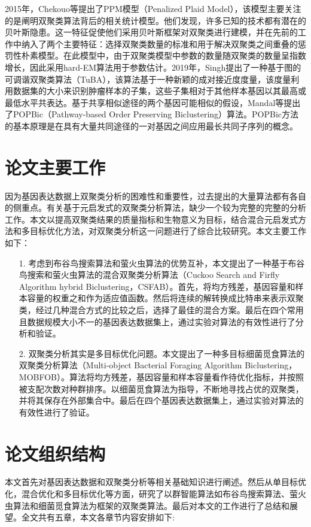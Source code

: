     2015年，Chekouo等提出了PPM模型（Penalized Plaid Model），该模型主要关注的是阐明双聚类算法背后的相关统计模型。他们发现，许多已知的技术都有潜在的贝叶斯隐患。这一特征促使他们采用贝叶斯框架对双聚类进行建模，并在先前的工作中纳入了两个主要特征：选择双聚类数量的标准和用于解决双聚类之间重叠的惩罚性朴素模型。在此模型中，由于双聚类模型中参数的数量随双聚类的数量呈指数增长，因此采用hard-EM算法用于参数估计。2019年，Singh提出了一种基于图的可调谐双聚类算法（TuBA），该算法基于一种新颖的成对接近度度量，该度量利用数据集的大小来识别肿瘤样本的子集，这些子集相对于其他样本基因以其最高或最低水平共表达。基于共享相似途径的两个基因可能相似的假设，Mandal等提出了POPBic（Pathway-based Order Preserving Biclustering）算法。POPBic方法的基本原理是在具有大量共同途径的一对基因之间应用最长共同子序列的概念。

\section{论文主要工作}
    因为基因表达数据上双聚类分析的困难性和重要性，过去提出的大量算法都有各自的侧重点。有关基于元启发式的双聚类分析算法，缺少一个较为完整的完整的分析工作。本文以提高双聚类结果的质量指标和生物意义为目标，结合混合元启发式方法和多目标优化方法，对双聚类分析这一问题进行了综合比较研究。本文主要工作如下：
    \begin{itemize}
       \item[1.] {考虑到布谷鸟搜索算法和萤火虫算法的优势互补，本文提出了一种基于布谷鸟搜索和萤火虫算法的混合双聚类分析算法（Cuckoo Search and Firfly Algorithm hybrid Biclustering，CSFAB）。首先，将均方残差，基因容量和样本容量的权重之和作为适应值函数。然后将连续的解转换成比特串来表示双聚类，经过几种混合方式的比较之后，选择了最佳的混合方案。最后在四个常用且数据规模大小不一的基因表达数据集上，通过实验对算法的有效性进行了分析和验证。}

       \item[2.] {双聚类分析其实是多目标优化问题。本文提出了一种多目标细菌觅食算法的双聚类分析算法（Multi-object Bacterial Foraging Algorithm Biclustering，MOBFOB）。算法将均方残差，基因容量和样本容量看作待优化指标，并按照被支配次数对种群排序。以细菌觅食算法为指导，不断地寻找占优的双聚类，并将其保存在外部集合中。最后在四个基因表达数据集上，通过实验对算法的有效性进行了验证。}
       
    \end{itemize}

\section{论文组织结构}
    本文首先对基因表达数据和双聚类分析等相关基础知识进行阐述。然后从单目标优化，混合优化和多目标优化等方面，研究了以群智能算法如布谷鸟搜索算法、萤火虫算法和细菌觅食算法为框架的双聚类算法。最后对本文的工作进行了总结和展望。全文共有五章，本文各章节内容安排如下:

